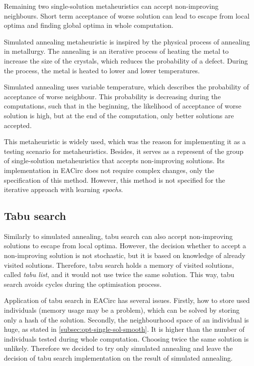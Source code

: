 \documentclass[
  print, %
  Table,   %
  nolof,     %
  nolot,     %
  11pt, %
  oneside  %
]{fithesis3}
\begin{document}
Remaining two single-solution metaheuristics can accept non-improving neighbours. Short term acceptance of worse solution can lead to escape from local optima and finding global optima in whole computation.

Simulated annealing metaheuristic is inspired by the physical process of annealing in metallurgy. The annealing is an iterative process of heating the metal to increase the size of the crystals, which reduces the probability of a defect. During the process, the metal is heated to lower and lower temperatures.

Simulated annealing uses variable temperature, which describes the probability of acceptance of worse neighbour. This probability is decreasing during the computations, such that in the beginning, the likelihood of acceptance of worse solution is high, but at the end of the computation, only better solutions are accepted.

This metaheuristic is widely used, which was the reason for implementing it as a testing scenario for metaheuristics. Besides, it serves as a represent of the group of single-solution metaheuristics that accepts non-improving solutions. Its implementation in EACirc does not require complex changes, only the specification of this method. However, this method is not specified for the iterative approach with learning \textit{epochs}.

\subsection{Tabu search}
\label{subsec:opt-single-sol-tabu}

Similarly to simulated annealing, tabu search can also accept non-improving solutions to escape from local optima. However, the decision whether to accept a non-improving solution is not stochastic, but it is based on knowledge of already visited solutions. Therefore, tabu search holds a memory of visited solutions, called \textit{tabu list}, and it would not use twice the same solution. This way, tabu search avoids cycles during the optimisation process.

Application of tabu search in EACirc has several issues. Firstly, how to store used individuals (memory usage may be a problem), which can be solved by storing only a hash of the solution. Secondly, the neighbourhood space of an individual is huge, as stated in \cref{subsec:opt-single-sol-smooth}. It is higher than the number of individuals tested during whole computation. Choosing twice the same solution is unlikely. Therefore we decided to try only simulated annealing and leave the decision of tabu search implementation on the result of simulated annealing.
\end{document}
